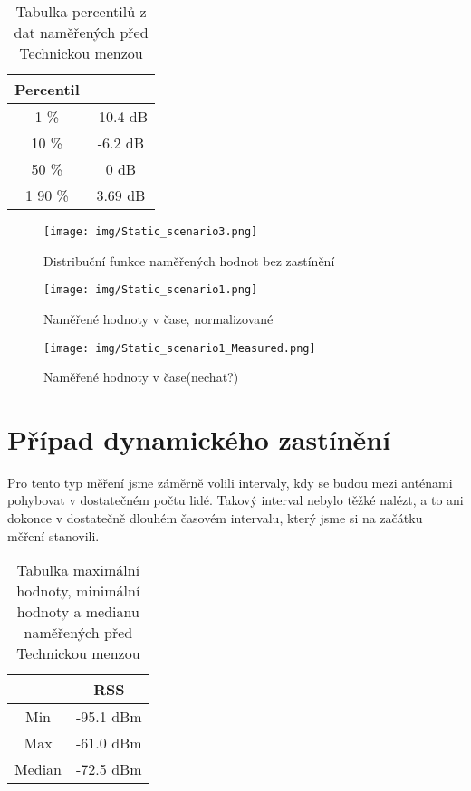 \begin{table}[h!]
\centering
\begin{tabular}{|c|c|}
  \hline
   Percentil &  \\
  \hline
  1 \% & -10.4 dB\\
  \hline
  10 \% & -6.2 dB\\
  \hline
  50 \% & 0 dB \\
  \hline1 
  90 \% & 3.69 dB \\
  \hline
\end{tabular}
\caption{Tabulka percentilů z dat naměřených před Technickou menzou}
\end{table}

\clearpage

\begin{figure}[h!]
    \centering
    \texttt{[image: img/Static\_scenario3.png]}
    \caption{Distribuční funkce naměřených hodnot bez zastínění}
    \label{fig:my_label}
\end{figure}

\begin{figure}[h!]
    \centering
    \texttt{[image: img/Static\_scenario1.png]}
    \caption{Naměřené hodnoty v čase, normalizované}
    \label{fig:my_label}
\end{figure}

\clearpage

\begin{figure}[h!]
    \centering
    \texttt{[image: img/Static\_scenario1\_Measured.png]}
    \caption{Naměřené hodnoty v čase(nechat?)}
    \label{fig:my_label}
\end{figure}

\section{Případ dynamického zastínění}
Pro tento typ měření jsme záměrně volili intervaly, kdy se budou mezi anténami pohybovat v dostatečném počtu lidé. Takový interval nebylo těžké nalézt, a to ani dokonce v dostatečně dlouhém časovém intervalu, který jsme si na začátku měření stanovili.

\begin{table}[h!]
\centering
\begin{tabular}{|c|c|}
  \hline
   & RSS \\
  \hline
  Min & -95.1 dBm\\
  \hline
  Max & -61.0 dBm\\
  \hline
  Median & -72.5 dBm \\
  \hline
\end{tabular}
\caption{Tabulka maximální hodnoty, minimální hodnoty a medianu naměřených před Technickou menzou}
\end{table}

